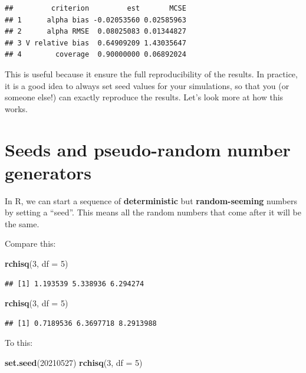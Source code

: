 \documentclass[
]{book}
\newenvironment{Shaded}{\begin{snugshade}}{\end{snugshade}}
\newcommand{\AttributeTok}[1]{\textcolor[rgb]{0.13,0.29,0.53}{#1}}
\newcommand{\DecValTok}[1]{\textcolor[rgb]{0.00,0.00,0.81}{#1}}
\newcommand{\FunctionTok}[1]{\textcolor[rgb]{0.13,0.29,0.53}{\textbf{#1}}}
\newcommand{\NormalTok}[1]{#1}
\begin{document}
\begin{verbatim}
##         criterion         est       MCSE
## 1      alpha bias -0.02053560 0.02585963
## 2      alpha RMSE  0.08025083 0.01344827
## 3 V relative bias  0.64909209 1.43035647
## 4        coverage  0.90000000 0.06892024
\end{verbatim}

This is useful because it ensure the full reproducibility of the results. In practice, it is a good idea to always set seed values for your simulations, so that you (or someone else!) can exactly reproduce the results.
Let's look more at how this works.

\section{Seeds and pseudo-random number generators}\label{seeds-and-pseudo-random-number-generators}

In R, we can start a sequence of \textbf{deterministic} but \textbf{random-seeming} numbers by setting a ``seed''.
This means all the random numbers that come after it will be the same.

Compare this:

\begin{Shaded}
\begin{Highlighting}[]
\FunctionTok{rchisq}\NormalTok{(}\DecValTok{3}\NormalTok{, }\AttributeTok{df =} \DecValTok{5}\NormalTok{)}
\end{Highlighting}
\end{Shaded}

\begin{verbatim}
## [1] 1.193539 5.338936 6.294274
\end{verbatim}

\begin{Shaded}
\begin{Highlighting}[]
\FunctionTok{rchisq}\NormalTok{(}\DecValTok{3}\NormalTok{, }\AttributeTok{df =} \DecValTok{5}\NormalTok{)}
\end{Highlighting}
\end{Shaded}

\begin{verbatim}
## [1] 0.7189536 6.3697718 8.2913988
\end{verbatim}

To this:

\begin{Shaded}
\begin{Highlighting}[]
\FunctionTok{set.seed}\NormalTok{(}\DecValTok{20210527}\NormalTok{)}
\FunctionTok{rchisq}\NormalTok{(}\DecValTok{3}\NormalTok{, }\AttributeTok{df =} \DecValTok{5}\NormalTok{)}
\end{Highlighting}
\end{Shaded}
\end{document}
